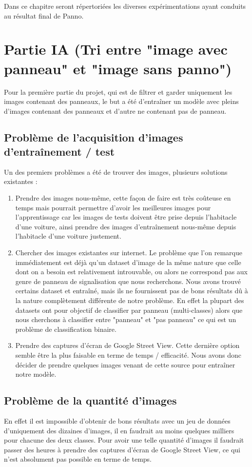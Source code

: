 \documentclass[a4paper,10pt,openany,oneside]{report}
\begin{document}
Dans ce chapitre seront répertoriées les diverses expérimentations ayant conduits au résultat final de Panno.

\section{Partie IA (Tri entre "image avec panneau" et "image sans panno")}
Pour la première partie du projet, qui est de filtrer et garder uniquement les images contenant des panneaux, le but a été d'entraîner un modèle avec pleins d'images contenant des panneaux et d'autre ne contenant pas de panneau.

\subsection{Problème de l’acquisition d'images d'entraînement / test}
Un des premiers problèmes a été de trouver des images, plusieurs solutions existantes :
\begin{enumerate}
\item Prendre des images nous-même, cette façon de faire est très coûteuse en temps mais pourrait permettre d'avoir les meilleures images pour l'apprentissage car les images de tests doivent être prise depuis l'habitacle d'une voiture, ainsi prendre des images d'entraînement nous-même depuis l'habitacle d'une voiture justement.
\item Chercher des images existantes sur internet. Le problème que l'on remarque immédiatement est déjà qu'un dataset d'image de la même nature que celle dont on a besoin est relativement introuvable, ou alors ne correspond pas aux genre de panneau de signalisation que nous recherchons. Nous avons trouvé certains dataset et entraîné, mais ils ne fournissent pas de bons résultats dû à la nature complètement différente de notre problème. En effet la plupart des datasets ont pour objectif de classifier par panneau (multi-classes) alors que nous cherchons à classifier entre "panneau" et "pas panneau" ce qui est un problème de classification binaire.
\item Prendre des captures d'écran de Google Street View. Cette dernière option semble être la plus faisable en terme de temps / efficacité. Nous avons donc décider de prendre quelques images venant de cette source pour entraîner notre modèle.
\end{enumerate}

\subsection{Problème de la quantité d'images}
En effet il est impossible d'obtenir de bons résultats avec un jeu de données d'uniquement des dizaines d'images, il en faudrait au moins quelques milliers pour chacune des deux classes. Pour avoir une telle quantité d'images il faudrait passer des heures à prendre des captures d'écran de Google Street View, ce qui n'est absolument pas possible en terme de temps.
\end{document}
